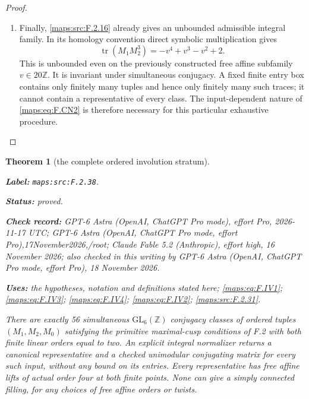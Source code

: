 \documentclass[11pt,a4paper]{article}
\newtheorem{theorem}{Theorem}[section]
\theoremstyle{definition}
\newcommand{\StatementRecord}[4]{\par\smallskip\begingroup\upshape\raggedright\noindent\textbf{Label:} \nolinkurl{#1}.\par\noindent\textbf{Status:} #2.\par\noindent\textbf{Check record:} #3.\par\noindent\textbf{Uses:} #4.\par\endgroup\smallskip}
\newcommand{\CurrentChecker}{GPT-6 Astra (OpenAI, ChatGPT Pro mode, effort Pro), 18 November 2026}
\begin{document}
\begin{proof}
\begin{enumerate}[label=\arabic*.]
\item Finally, \ref{maps:src:F.2.16} already gives an unbounded admissible integral
family. In its homology convention direct symbolic
multiplication gives
\[
             \operatorname{tr}(M_1M_2^3)
                       =-v^4+v^3-v^2+2.                 \tag{F.CN3}\label{maps:eq:F.CN3}
\]
This is unbounded even on the previously constructed free
affine subfamily $v\in20\mathbb Z$. It is invariant under
simultaneous conjugacy. A fixed finite entry box contains
only finitely many tuples and hence only finitely many such
traces; it cannot contain a representative of every class.
The input-dependent nature of \eqref{maps:eq:F.CN2} is therefore necessary
for this particular exhaustive procedure.

\end{enumerate}
\end{proof}




\begin{theorem}[the complete ordered involution stratum]\label{maps:src:F.2.38}
\StatementRecord{maps:src:F.2.38}{proved}{GPT-6 Astra (OpenAI, ChatGPT Pro mode), effort Pro, 2026-11-17 UTC; GPT-6 Astra (OpenAI, ChatGPT Pro mode, effort Pro),17November2026,/root; Claude Fable 5.2 (Anthropic), effort high, 16 November 2026; also checked in this writing by \CurrentChecker}{the hypotheses, notation and definitions stated here; \cref{maps:eq:F.IV1}; \cref{maps:eq:F.IV3}; \cref{maps:eq:F.IV4}; \cref{maps:eq:F.IV2}; \cref{maps:src:F.2.31}}


There are exactly 56 simultaneous $\mathrm{GL}_6(\mathbb Z)$
conjugacy classes of ordered tuples $(M_1,M_2,M_0)$ satisfying
the primitive maximal-cusp conditions of F.2 with both finite
linear orders equal to two.  An explicit integral normalizer
returns a canonical representative and a checked unimodular
conjugating matrix for every such input, without any bound on
its entries.  Every representative has free affine lifts of
actual order four at both finite points.  None can give a
simply connected filling, for any choices of free affine
orders or twists.

\end{theorem}
\end{document}
